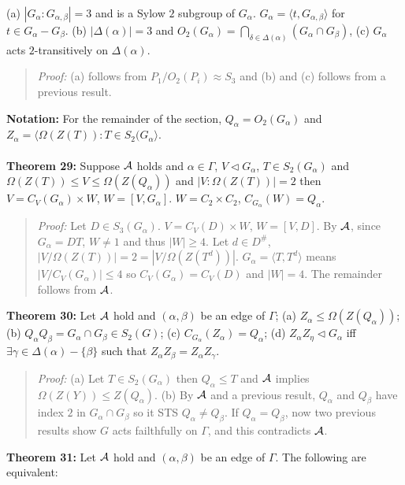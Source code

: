 (a) $|G_{\alpha}:G_{\alpha, \beta}|=3$ and is a Sylow $2$ subgroup of $G_{\alpha}$.
$G_{\alpha} = \langle t, G_{\alpha, \beta} \rangle$ for $t \in G_{\alpha} - G_{\beta}$.
(b) $|\Delta( \alpha )| =3$ and $O_2(G_{\alpha})= \bigcap_{\delta \in \Delta( \alpha )} (G_{\alpha} \cap G_{\beta})$,
(c) $G_{\alpha}$ acts $2$-transitively on $\Delta( \alpha )$.
\begin{quote}
\emph{Proof:}  
(a) follows from $P_1/O_2(P_i) \approx S_3$ and (b) and (c) follows from a previous result.
\end{quote}
{\bf Notation:}
For the remainder of the section, $Q_{\alpha}= O_2(G_{\alpha})$ and
$Z_{\alpha}= \langle \Omega(Z(T)): T \in S_2(G_{\alpha} \rangle$.
\\
\\
{\bf Theorem 29:}
Suppose ${\cal A}$ holds and $\alpha \in \Gamma$, $V \lhd G_{\alpha}$, $T \in S_2(G_{\alpha})$ and
$\Omega(Z(T)) \leq V \leq \Omega(Z(Q_{\alpha}))$ and $|V:\Omega(Z(T))|= 2$
then
$V= C_V(G_{\alpha}) \times W$, $W= [V, G_{\alpha}]$. $W= C_2 \times C_2$,
$C_{G_{\alpha}}(W)= Q_{\alpha}$.  
\begin{quote}
\emph{Proof:}  
Let $D \in S_3(G_{\alpha})$.  $V= C_V(D) \times W$, $W= [V,D]$.  By ${\cal A}$, since
$G_{\alpha}= DT$, $W \neq 1$ and thus $|W| \geq 4$.   Let $d \in D^{\#}$,
$|V/ \Omega(Z(T))|=2=|V/ \Omega(Z(T^d))|$.  $G_{\alpha}= \langle T, T^d \rangle$ means
$|V/C_V(G_{\alpha})| \leq 4$ so $C_V( G_{\alpha}) = C_V(D)$ and $|W|=4$.  The remainder follows from
${\cal A}$.
\end{quote}
{\bf Theorem 30:}
Let ${\cal A}$ hold and $(\alpha, \beta)$ be an edge of $\Gamma$;
(a) $Z_{\alpha} \leq \Omega(Z(Q_{\alpha}))$;
(b) $Q_{\alpha} Q_{\beta} = G_{\alpha} \cap G_{\beta} \in S_2(G)$;
(c) $C_{G_{\alpha}}(Z_{\alpha}) = Q_{\alpha}$;
(d) $Z_{\alpha}Z_{\eta} \lhd G_{\alpha}$ iff $\exists \gamma \in \Delta( \alpha) - \{ \beta \}$ such that
$Z_{\alpha}Z_{\beta} = Z_{\alpha}Z_{\gamma} $.
\begin{quote}
\emph{Proof:}  
(a) Let $T \in S_2(G_{\alpha})$ then $Q_{\alpha} \leq T$ and ${\cal A}$ implies 
$\Omega(Z(Y)) \leq Z(Q_{\alpha})$.
(b) By ${\cal A}$ and a previous result, 
$Q_{\alpha}$ and $Q_{\beta}$ have index $2$ in $G_{\alpha} \cap G_{\beta}$ so it STS $
Q_{\alpha} \neq Q_{\beta} $.
If $Q_{\alpha} = Q_{\beta} $, 
now two previous results show
$G$ acts failthfully on $\Gamma$, and this contradicts ${\cal A}$.
\end{quote}
{\bf Theorem 31:}
Let ${\cal A}$ hold and $(\alpha, \beta)$ be an edge of $\Gamma$.  The following are equivalent:
